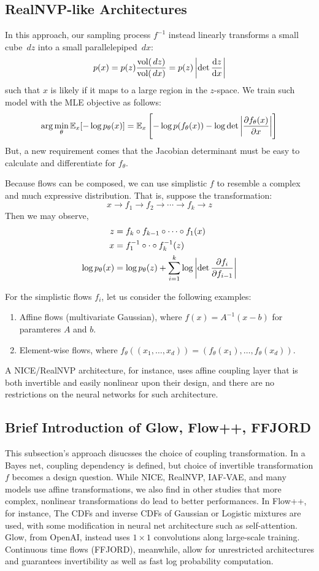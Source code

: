 \subsection{RealNVP-like Architectures}
In this approach, our sampling process $f^{-1}$ instead linearly transforms a small cube $\, dz$ into a small parallelepiped $\, dx$:
\[
    p(x) = p(z) \frac{{\rm vol}(\, dz)}{{\rm vol}(\, dx)} = p(z) \left| \det \dv{z}{x} \right|
\]
such that $x$ is likely if it maps to a large region in the $z$-space.
We train such model with the MLE objective as follows:
\[
    \arg \min_\theta \mathbb{E}_x [- \log p_\theta (x)] = \mathbb{E}_x \left[ -\log p(f_\theta(x)) - \log \det \left| \pdv{f_\theta (x)}{x} \right| \right]
\]
But, a new requirement comes that the Jacobian determinant must be easy to calculate and differentiate for $f_\theta$.

Because flows can be composed, we can use simplistic $f$ to resemble a complex and much expressive distribution.
That is, suppose the transformation:
\[
    x \rightarrow f_1 \rightarrow f_2 \rightarrow \cdots \rightarrow f_k \rightarrow z
\]
Then we may observe,
\begin{align*}
    z &= f_k \circ f_{k-1} \circ \cdots \circ f_1 (x) \\
    x &= f_1^{-1} \circ \cdot \circ f_k^{-1} (z) \\
    \log p_\theta (x) &= \log p_\theta (z) + \sum_{i=1}^k \log \left| \det \pdv{f_i}{f_{i-1}} \right|
\end{align*}

For the simplistic flows $f_i$, let us consider the following examples:
\begin{enumerate}
    \item Affine flows (multivariate Gaussian), where $f(x) = A^{-1} (x - b)$ for paramteres $A$ and $b$.
    \item Element-wise flows, where $f_\theta ((x_1, \dots, x_d)) = (f_\theta (x_1), \dots, f_\theta (x_d))$.
\end{enumerate}
A NICE/RealNVP architecture, for instance, uses affine coupling layer that is both invertible and easily nonlinear upon their design, and there are no restrictions on the neural networks for such architecture.

\subsection{Brief Introduction of Glow, Flow++, FFJORD}
This subsection's approach disucsses the choice of coupling transformation.
In a Bayes net, coupling dependency is defined, but choice of invertible transformation $f$ becomes a design question.
While NICE, RealNVP, IAF-VAE, and many models use affine transformations, we also find in other studies that more complex, nonlinear transformations do lead to better performances.
In Flow++, for instance, The CDFs and inverse CDFs of Gaussian or Logistic mixtures are used, with some modification in neural net architecture such as self-attention.
Glow, from OpenAI, instead uses $1 \times 1$ convolutions along large-scale training.
Continuous time flows (FFJORD), meanwhile, allow for unrestricted architectures and guarantees invertibility as well as fast log probability computation.

